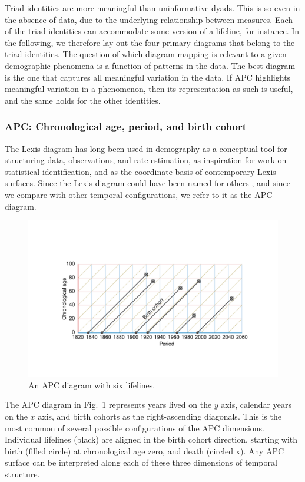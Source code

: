 \documentclass{bmcart}
\theoremstyle{definition}
\begin{document}
Triad identities are more meaningful than uninformative dyads. This
is so even in the absence of data, due to the underlying relationship between
measures. Each of the triad identities can accommodate some version of a
lifeline, for instance. In the following, we therefore lay out the four primary
diagrams that belong to the triad identities. The question of which diagram
mapping is relevant to a given demographic phenomena is a function of
patterns in the data. The best diagram is the one that captures all meaningful
variation in the data. If APC highlights meaningful variation in a phenomenon,
then its representation as such is useful, and the same holds for the other
identities.

\subsubsection{APC: Chronological age, period, and birth cohort}
\label{sec:apc}
\FloatBarrier
The Lexis diagram has long been used in demography as a conceptual
tool for structuring data, observations, and rate estimation, as inspiration for work
on statistical identification, and as the coordinate basis of contemporary
Lexis-surfaces. Since the Lexis diagram could have been named for others
\citep{keiding2011age, vandeschrick2001lexis}, and since we compare with other
temporal configurations, we refer to it as the APC diagram. 


\begin{figure}[h!] 
\caption{An APC diagram with six lifelines.}
\label{fig:APC}
\centering
\includegraphics[scale=0.8]{Fig1.pdf}
\end{figure}

The APC diagram in Fig.~1 represents years lived on the $y$
axis, calendar years on the $x$ axis, and birth cohorts as the right-ascending
diagonals. This is the most common of several possible configurations
of the APC dimensions. Individual lifelines (black) are aligned in the birth
cohort direction, starting with birth (filled circle) at chronological age zero, and death
(circled x). Any APC surface can be interpreted along each of these
three dimensions of temporal structure. 
\end{document}
